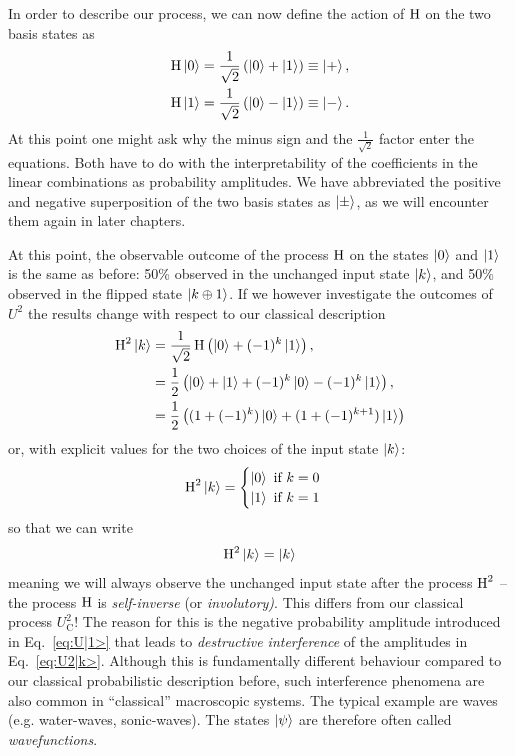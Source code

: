 In order to describe our process, we can now define the action of $\operatorname{H}$ on the two basis states as
\begin{align}
    \operatorname{H}\ket{0} &= \frac{1}{\sqrt{2}}\left( \ket{0} + \ket{1} \right) \equiv \ket{+}, \\
    \operatorname{H}\ket{1} &= \frac{1}{\sqrt{2}}\left( \ket{0} - \ket{1} \right) \equiv \ket{-}.\label{eq:U|1>}
\end{align}
At this point one might ask why the minus sign and the $\frac{1}{\sqrt{2}}$ factor enter the equations. Both have to do with the interpretability of the coefficients in the linear combinations as probability amplitudes. We have abbreviated the positive and negative superposition of the two basis states as $\ket{\pm}$, as we will encounter them again in later chapters.

At this point, the observable outcome of the process $\operatorname{H}$ on the states $\ket{0}$ and $\ket{1}$ is the same as before: 50\% observed in the unchanged input state $\ket{k}$, and 50\% observed in the flipped state $\ket{k\oplus 1}$. 
If we however investigate the outcomes of $U^2$ the results change with respect to our classical description
\begin{align}
    \operatorname{H}^2\ket{k} &= \frac{1}{\sqrt{2}} \operatorname{H} \left( \ket{0} + (-1)^k \ket{1} \right),\\
    &= \frac{1}{2} \left( \ket{0} + \ket{1} + (-1)^k \ket{0} - (-1)^k \ket{1} \right),\\
    &= \frac{1}{2} \left( (1+(-1)^k)\ket{0} + (1 + (-1)^{k+1})\ket{1} \right)\label{eq:U2|k>}
\end{align}
or, with explicit values for the two choices of the input state $\ket{k}$:
\begin{align}
    \operatorname{H}^2\ket{k} = \begin{cases}
        \ket{0} \text{ if } k=0 \\
        \ket{1} \text{ if } k=1
    \end{cases}
\end{align}
so that we can write
\begin{align}
    \operatorname{H}^2\ket{k} = \ket{k}
\end{align}
meaning we will always observe the unchanged input state after the process $\operatorname{H}^2$ -- the process $\operatorname{H}$ is \textit{self-inverse} (or \textit{involutory)}. This differs from our classical process $U_\text{C}^2$! The reason for this is the negative probability amplitude introduced in Eq.~\eqref{eq:U|1>} that leads to \textit{destructive interference} of the amplitudes in Eq.~\eqref{eq:U2|k>}. Although this is fundamentally different behaviour compared to our classical probabilistic description before, such interference phenomena are also common in ``classical'' macroscopic systems. The typical example are waves (e.g. water-waves, sonic-waves). The states $\ket{\psi}$ are therefore often called \textit{wavefunctions}.

